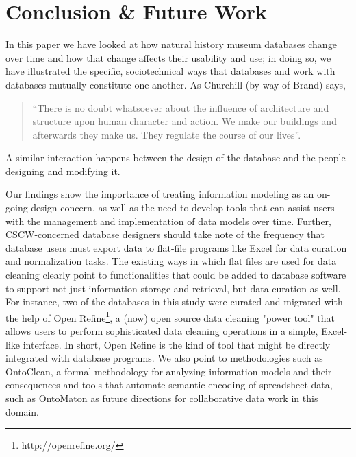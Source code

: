 \section{Conclusion & Future Work}

In this paper we have looked at how natural history museum databases change over time and how that change affects their usability and use; in doing so, we have illustrated the specific, sociotechnical ways that databases and work with databases mutually constitute one another. As Churchill (by way of Brand) says,
\begin{quote}
“There is no doubt whatsoever about the influence of architecture and structure upon human character and action. We make our buildings and afterwards they make us. They regulate the course of our lives”. 
\end{quote}
A similar interaction happens between the design of the database and the people designing and modifying it.

Our findings show the importance of treating information modeling as an on-going design concern, as well as the need to develop tools that can assist users with the management and implementation of data models over time. Further, CSCW-concerned database designers should take note of the frequency that database users must export data to flat-file programs like Excel for data curation and normalization tasks. The existing ways in which flat files are used for data cleaning clearly point to functionalities that could be added to database software to support not just information storage and retrieval, but data curation as well.  For instance, two of the databases in this study were curated and migrated with the help of Open Refine\footnote{http://openrefine.org/}, a (now) open source data cleaning "power tool" that allows users to perform sophisticated data cleaning operations in a simple, Excel-like interface.  In short, Open Refine is the kind of tool that might be directly integrated with database programs. We also point to methodologies such as OntoClean, a formal methodology for analyzing information models and their consequences \cite{Guarino_2004} and tools that automate semantic encoding of spreadsheet data, such as OntoMaton \cite{Maguire_2012} as future directions for collaborative data work in this domain. 
